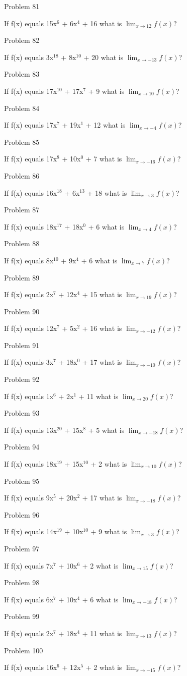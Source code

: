 \documentclass{article}
\begin{document}
Problem 81

If f(x) equals 15x$^{6}$ + 6x$^{4}$ + 16 what is $\lim_{x\to 12} f(x) $?

Problem 82

If f(x) equals 3x$^{18}$ + 8x$^{10}$ + 20 what is $\lim_{x\to -13} f(x) $?

Problem 83

If f(x) equals 17x$^{10}$ + 17x$^{7}$ + 9 what is $\lim_{x\to 10} f(x) $?

Problem 84

If f(x) equals 17x$^{7}$ + 19x$^{1}$ + 12 what is $\lim_{x\to -4} f(x) $?

Problem 85

If f(x) equals 17x$^{8}$ + 10x$^{0}$ + 7 what is $\lim_{x\to -16} f(x) $?

Problem 86

If f(x) equals 16x$^{18}$ + 6x$^{13}$ + 18 what is $\lim_{x\to 3} f(x) $?

Problem 87

If f(x) equals 18x$^{17}$ + 18x$^{0}$ + 6 what is $\lim_{x\to 4} f(x) $?

Problem 88

If f(x) equals 8x$^{10}$ + 9x$^{4}$ + 6 what is $\lim_{x\to 7} f(x) $?

Problem 89

If f(x) equals 2x$^{7}$ + 12x$^{4}$ + 15 what is $\lim_{x\to 19} f(x) $?

Problem 90

If f(x) equals 12x$^{7}$ + 5x$^{2}$ + 16 what is $\lim_{x\to -12} f(x) $?

Problem 91

If f(x) equals 3x$^{7}$ + 18x$^{0}$ + 17 what is $\lim_{x\to -10} f(x) $?

Problem 92

If f(x) equals 1x$^{6}$ + 2x$^{1}$ + 11 what is $\lim_{x\to 20} f(x) $?

Problem 93

If f(x) equals 13x$^{20}$ + 15x$^{8}$ + 5 what is $\lim_{x\to -18} f(x) $?

Problem 94

If f(x) equals 18x$^{19}$ + 15x$^{10}$ + 2 what is $\lim_{x\to 10} f(x) $?

Problem 95

If f(x) equals 9x$^{5}$ + 20x$^{2}$ + 17 what is $\lim_{x\to -18} f(x) $?

Problem 96

If f(x) equals 14x$^{19}$ + 10x$^{10}$ + 9 what is $\lim_{x\to 3} f(x) $?

Problem 97

If f(x) equals 7x$^{7}$ + 10x$^{6}$ + 2 what is $\lim_{x\to 15} f(x) $?

Problem 98

If f(x) equals 6x$^{7}$ + 10x$^{4}$ + 6 what is $\lim_{x\to -18} f(x) $?

Problem 99

If f(x) equals 2x$^{7}$ + 18x$^{4}$ + 11 what is $\lim_{x\to 13} f(x) $?

Problem 100

If f(x) equals 16x$^{6}$ + 12x$^{5}$ + 2 what is $\lim_{x\to -15} f(x) $?
\end{document}
